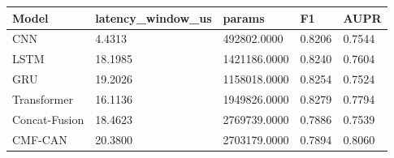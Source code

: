 \begin{tabular}{lllll}
\toprule
Model & latency_window_us & params & F1 & AUPR \\
\midrule
CNN & 4.4313 & 492802.0000 & 0.8206 & 0.7544 \\
LSTM & 18.1985 & 1421186.0000 & 0.8240 & 0.7604 \\
GRU & 19.2026 & 1158018.0000 & 0.8254 & 0.7524 \\
Transformer & 16.1136 & 1949826.0000 & 0.8279 & 0.7794 \\
Concat-Fusion & 18.4623 & 2769739.0000 & 0.7886 & 0.7539 \\
CMF-CAN & 20.3800 & 2703179.0000 & 0.7894 & 0.8060 \\
\bottomrule
\end{tabular}
